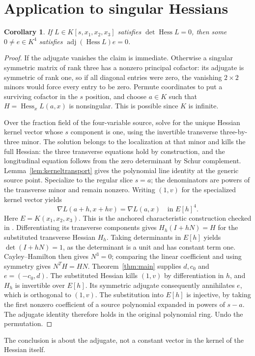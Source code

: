 \documentclass[11pt,a4paper]{article}
\newtheorem{corollary}[theorem]{Corollary}
\newcommand{\Hess}{\operatorname{Hess}}
\newcommand{\adj}{\operatorname{adj}}
\begin{document}
\section{Application to singular Hessians}\label{sec:singular}
\begin{corollary}\label{cor:singular}
If $L\in K[s,x_1,x_2,x_3]$ satisfies $\det\Hess L=0$, then some $0\ne e\in K^4$ satisfies $\adj(\Hess L)e=0$.
\end{corollary}
\begin{proof}
If the adjugate vanishes the claim is immediate. Otherwise a singular symmetric matrix of rank three has a nonzero principal cofactor: its adjugate is symmetric of rank one, so if all diagonal entries were zero, the vanishing $2\times2$ minors would force every entry to be zero. Permute coordinates to put a surviving cofactor in the $s$ position, and choose $a\in K$ such that $H=\Hess_x L(a,x)$ is nonsingular. This is possible since $K$ is infinite.

Over the fraction field of the four-variable source, solve for the unique Hessian kernel vector whose $s$ component is one, using the invertible transverse three-by-three minor. The solution belongs to the localization at that minor and kills the full Hessian: the three transverse equations hold by construction, and the longitudinal equation follows from the zero determinant by Schur complement. Lemma~\ref{lem:kerneltransport} gives the polynomial line identity at the generic source point. Specialize to the regular slice $s=a$; the denominators are powers of the transverse minor and remain nonzero. Writing $(1,v)$ for the specialized kernel vector yields
\[
 \nabla L(a+h,x+hv)=\nabla L(a,x)\quad\text{in }E[h]^4.
\]
Here $E=K(x_1,x_2,x_3)$. This is the anchored characteristic construction checked in . Differentiating its transverse components gives $H_h(I+hN)=H$ for the substituted transverse Hessian $H_h$. Taking determinants in $E[h]$ yields $\det(I+hN)=1$, as the determinant is a unit and has constant term one. Cayley--Hamilton then gives $N^3=0$; comparing the linear coefficient and using symmetry gives $N^TH=HN$. Theorem~\ref{thm:main} supplies $d,c_0$ and $e=(-c_0,d)$. The substituted Hessian kills $(1,v)$ by differentiation in $h$, and $H_h$ is invertible over $E[h]$. Its symmetric adjugate consequently annihilates $e$, which is orthogonal to $(1,v)$. The substitution into $E[h]$ is injective, by taking the first nonzero coefficient of a source polynomial expanded in powers of $s-a$. The adjugate identity therefore holds in the original polynomial ring. Undo the permutation.
\end{proof}
The conclusion is about the adjugate, not a constant vector in the kernel of the Hessian itself.
\end{document}
